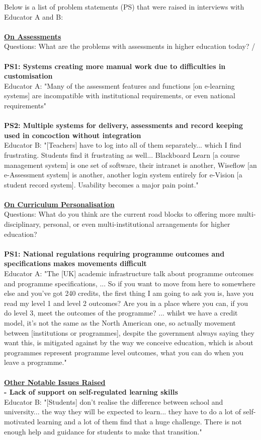 Below is a list of problem statements (PS) that were raised in interviews with Educator A and B:\\
\\
\underline{\textbf{On Assessments}}
\\
Questions: What are the problems with assessments in higher education today? / \\
\\
\textbf{PS1: Systems creating more manual work due to difficulties in customisation}\\
Educator A: "Many of the assessment features and functions [on e-learning systems] are incompatible 
with institutional requirements, or even national requirements"\\
\\
\textbf{PS2: Multiple systems for delivery, assessments and record keeping used in concoction without integration}\\
Educator B: "[Teachers] have to log into all of them separately... which I find frustrating. Students find
it frustrating as well... Blackboard Learn [a course management system] is one set of software, their 
intranet is another, Wiseflow [an e-Assessment system] is another, another login system entirely for 
e-Vision [a student record system]. Usability becomes a major pain point."\\
\\
\underline{\textbf{On Curriculum Personalisation}}
\\
Questions: What do you think are the current road blocks to offering more multi-disciplinary, personal, 
or even multi-institutional arrangements for higher education?
\\\\
\textbf{PS1: National regulations requiring programme outcomes and specifications makes movements 
difficult}\\
Educator A: "The [UK] academic infrastructure talk about programme outcomes and programme specifications,
... So if you want to move from here to somewhere else and you’ve got 240 credits, the first thing I am 
going to ask you is, have you read my level 1 and level 2 outcomes? Are you in a place where you can, 
if you do level 3, meet the outcomes of the programme? ... whilst we have a credit model, it’s not the 
same as the North American one, so actually movement between [institutions or programmes], despite the 
government always saying they want this, is mitigated against by the way we conceive education, 
which is about programmes represent programme level outcomes, what you can do when you leave a programme."
\\\\
\underline{\textbf{Other Notable Issues Raised}}
\\
\textbf{- Lack of support on self-regulated learning skills}\\
Educator B: "[Students] don't realise the difference between school and university... the way they will
be expected to learn... they have to do a lot of self-motivated learning and a lot of them find that a 
huge challenge. There is not enough help and guidance for students to make that transition."

